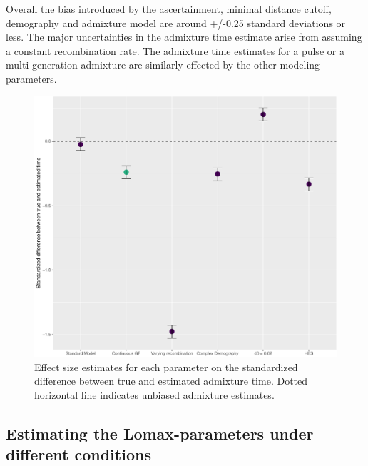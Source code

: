 \documentclass[]{article}
\begin{document}
Overall the bias introduced by the ascertainment, minimal distance
cutoff, demography and admixture model are  around +/-0.25 standard deviations or less. The major uncertainties in the admixture time
estimate arise from assuming a constant recombination rate. The
admixture time estimates for a pulse or a multi-generation admixture are similarly effected by the other modeling parameters.

\begin{figure}
\centering
\includegraphics{Admixture_Time_Inference_Paper_Draft_files/figure-latex/fig3-1.pdf}
\caption{\label{fig:fig3} Effect size estimates for each parameter on the standardized difference between true and estimated admixture time. Dotted horizontal line indicates unbiased admixture estimates.}
\end{figure}

\subsection{Estimating the Lomax-parameters under different conditions}\label{estimating the Lomax-parameters under different conditions}
\end{document}
